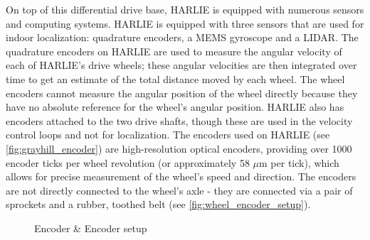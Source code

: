 On top of this differential drive base, HARLIE is equipped with numerous sensors and computing systems. HARLIE is equipped with three sensors that are used for indoor localization: quadrature encoders, a MEMS gyroscope and a LIDAR. The quadrature encoders on HARLIE are used to measure the angular velocity of each of HARLIE's drive wheels; these angular velocities are then integrated over time to get an estimate of the total distance moved by each wheel. The wheel encoders cannot measure the angular position of the wheel directly because they have no absolute reference for the wheel's angular position. HARLIE also has encoders attached to the two drive shafts, though these are used in the velocity control loops and not for localization. The encoders used on HARLIE (see \autoref{fig:grayhill_encoder}) are high-resolution optical encoders, providing over 1000 encoder ticks per wheel revolution (or approximately 58 $\mu$m per tick), which allows for precise measurement of the wheel's speed and direction. The encoders are not directly connected to the wheel's axle - they are connected via a pair of sprockets and a rubber, toothed belt (see \autoref{fig:wheel_encoder_setup}).

\begin{figure}
\centering
{}
\hfill
{}
\caption{Encoder \& Encoder setup}
\label{fig:encoder_and_setup}
\end{figure}

